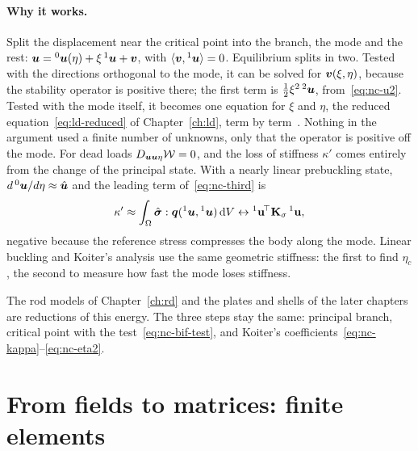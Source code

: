 \paragraph{Why it works.}
%
Split the displacement near the critical point into the branch, the mode and the rest:
$\bm{u} = {}^0\bm{u}(\eta) + \xi\,{}^1\bm{u} + \bm{v}$, with $\langle \bm{v},{}^1\bm{u}\rangle = 0$. Equilibrium
splits in two. Tested with the directions orthogonal to the mode, it can be solved for
$\bm{v}(\xi,\eta)$, because the stability operator is positive there; the first term is
$\tfrac12\xi^2\,{}^2\bm{u}$, from~\eqref{eq:nc-u2}. Tested with the mode itself, it becomes one
equation for $\xi$ and $\eta$, the reduced equation~\eqref{eq:ld-reduced} of
Chapter~\ref{ch:ld}, term by term~\cite[pp.~57--62]{nc-triantafyllidis2011}. Nothing in the
argument used a finite number of unknowns, only that the operator is positive off the mode.
For dead loads $D_{\bm{u}\bm{u}\eta}\mathcal{W} = 0$, and the loss of stiffness $\kappa'$ comes
entirely from the change of the principal state. With a nearly linear prebuckling state,
$d\,{}^0\bm{u}/d\eta \approx \hat{\bm{u}}$ and the leading term of~\eqref{eq:nc-third} is
\begin{equation}\label{eq:nc-kappa-lba}
  \kappa' \approx \int_\Omega \hat{\bm{\sigma}}:\bm{q}({}^1\bm{u},{}^1\bm{u})\,\mathrm{d} V
  \leftrightarrow {}^1\mathbf{u}^{\!\top}\mathbf{K}_\sigma\,{}^1\mathbf{u},
\end{equation}
negative because the reference stress compresses the body along the mode. Linear buckling and
Koiter's analysis use the same geometric stiffness: the first to find $\eta_c$, the second to
measure how fast the mode loses stiffness.

The rod models of Chapter~\ref{ch:rd} and the plates and shells of the later chapters are
reductions of this energy. The three steps stay the same: principal branch, critical point
with the test~\eqref{eq:nc-bif-test}, and Koiter's coefficients~\eqref{eq:nc-kappa}--\eqref{eq:nc-eta2}.

\section{From fields to matrices: finite elements}\label{sec:nc-fe}
%

